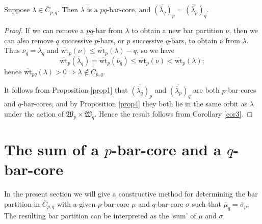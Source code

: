 \documentclass[ALCO, Unicode,published]{cedram}
\begin{document}
\begin{lemm}\label{lem1}
Suppose $\lambda\in\overline{C}_{p,q}$. Then $\lambda$ is a $pq$-bar-core, and $\overline{(\overline{\lambda}_q)}_p=\overline{(\overline{\lambda}_p)}_q$.
\end{lemm}
\begin{proof}
If we can remove a $pq$-bar from $\lambda$ to obtain a new bar partition $\nu$, then we can also remove $q$ successive $p$-bars, or $p$ successive $q$-bars, to obtain $\nu$ from $\lambda$. Thus $\overline{\nu}_q=\overline{\lambda}_q$ and $\overline{\text{wt}}_p(\nu)\leq\overline{\text{wt}}_p(\lambda)-q$, so we have 
$$\overline{\text{wt}}_p(\overline{\lambda}_q)=\overline{\text{wt}}_p(\overline{\nu}_q)\leq\overline{\text{wt}}_p(\nu)<\overline{\text{wt}}_p(\lambda);$$ 
hence $\overline{\text{wt}}_{pq}(\lambda)>0\Rightarrow\lambda\not\in\overline{C}_{p,q}$. 

It follows from Proposition \ref{prop1} that $\overline{(\overline{\lambda}_q)}_p$ and $\overline{(\overline{\lambda}_p)}_q$ are both $p$-bar-cores and $q$-bar-cores, and by Proposition \ref{prop4} they both lie in the same orbit as $\lambda$ under the action of $\mathfrak{W}_p\times\mathfrak{W}_q$. Hence the result follows from Corollary \ref{cor3}.
\end{proof}

\section{The sum of a $p$-bar-core and a $q$-bar-core}
 
In the present section we will give a constructive method for determining the bar partition in $\overline{C}_{p,q}$ with a given $p$-bar-core $\mu$ and $q$-bar-core $\sigma$ such that $\overline{\mu}_q=\overline{\sigma}_p$. The resulting bar partition can be interpreted as the `sum' of $\mu$ and $\sigma$. 
\end{document}
